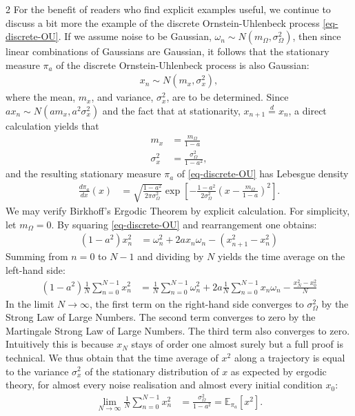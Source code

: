 \documentclass[11pt]{article}
\begin{document}
\begin{multicols}{2}
For the benefit of readers who  find explicit examples useful, we
continue to discuss a bit more the example of the discrete Ornstein-Uhlenbeck process \eqref{eq-discrete-OU}. If we assume noise to be Gaussian, $\omega_n \sim N(m_\Omega,\sigma^2_\Omega )$, then since linear combinations of Gaussians are Gaussian, it follows that the stationary measure $\pi_a$ of the discrete Ornstein-Uhlenbeck process is also Gaussian:
\begin{align}
x_n \sim N(m_x, \sigma^2_x),
\end{align}
where the mean, $m_x$, and variance, $\sigma_x^2$, are to be determined. Since $a x_n \sim N(a m_x, a^2 \sigma^2_x)$ and the fact that at stationarity, $x_{n+1}\overset{d}{=}x_n$, a direct calculation yields that
\begin{align}
m_x & = \frac{m_\Omega}{1-a}\\
\sigma^2_x &= \frac{\sigma_\Omega^2}{1-a^2},
\end{align}
and the resulting stationary measure $\pi_a$ of \eqref{eq-discrete-OU} has Lebesgue density
\begin{align}
\frac{d\pi_a}{dx}(x) & = \sqrt{\frac{1-a^2}{2 \pi \sigma_\Omega^2 } } \exp \left[ -\frac{1-a^2}{2 \sigma_\Omega^2} \left(x - \frac{m_\Omega}{1-a} \right)^2\right].
\end{align}
We may verify Birkhoff's Ergodic Theorem by explicit calculation.
For simplicity, let $m_\Omega = 0$.
By squaring \eqref{eq-discrete-OU} and rearrangement one obtains:
\begin{align}
(1 - a^2) x_n^2 & =\omega_{n}^2 + 2 a x_n \omega_{n}  - (x_{n+1}^2 - x_n^2)
\end{align}
Summing from $n=0$ to $N-1$ and dividing by $N$ yields the time average on the left-hand side:
\begin{align}
 (1 - a^2) \frac{1}{N} \sum_{n=0}^{N-1} x_n^2 & =  \frac{1}{N} \sum_{n=0}^{N-1} \omega_{n}^2 
 + 2 a  \frac{1}{N}\sum_{n=0}^{N-1}  x_n \omega_{n} 
 - \frac{x_N^2 - x_0^2}{N}  \label{eq-time-average-variance}
\end{align}
In the limit $N \to \infty$, the first term on the right-hand side converges to $\sigma_\Omega^2$ by the Strong Law of Large Numbers.
The second term converges to zero by the Martingale Strong Law of Large Numbers.
The third term also converges to zero.
Intuitively this is because $x_N$ stays of order one almost surely but a full proof is technical.
We thus obtain that the time average of $x^2$ along a trajectory is equal to the variance $\sigma_x^2$ of the stationary distribution of $x$ as expected by ergodic theory, for almost every noise realisation and almost every initial condition $x_0$:
\begin{align}
\lim_{N\to\infty}\frac{1}{N} \sum_{n=0}^{N-1} x_n^2  & = \frac{\sigma_\Omega^2}{1-a^2} = \mathbb{E}_{\pi_a}\left[ x^2\right].\label{OUerg}
\end{align}


\end{multicols}
\end{document}
